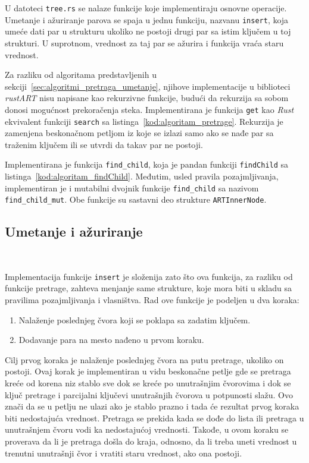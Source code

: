 \documentclass[12pt,oneside]{memoir}
\begin{document}
U datoteci \texttt{tree.rs} se nalaze funkcije koje implementiraju
osnovne operacije.
Umetanje i ažuriranje parova se spaja u jednu funkciju,
nazvanu \texttt{insert}, koja umeće dati par
u strukturu ukoliko ne postoji drugi par sa istim ključem u toj strukturi.
U suprotnom, vrednost za taj par se ažurira i funkcija vraća staru vrednost.

Za razliku od algoritama predstavljenih u
sekciji~\ref{sec:algoritmi_pretraga_umetanje}, njihove implementacije u
biblioteci \textit{rustART} nisu napisane kao rekurzivne funkcije,
budući da rekurzija sa sobom donosi mogućnost prekoračenja
steka. Implementirana je
funkcija \texttt{get} kao \textit{Rust} ekvivalent funkciji
\texttt{search} sa listinga~\ref{kod:algoritam_pretrage}.
Rekurzija je zamenjena beskonačnom petljom iz koje se izlazi samo
ako se nađe par sa traženim ključem ili se utvrdi da takav par
ne postoji.

Implementirana je funkcija \texttt{find\_child},
koja je pandan funkciji \texttt{findChild}
sa listinga~\ref{kod:algoritam_findChild}. Međutim, usled
pravila pozajmljivanja, implementiran je i mutabilni dvojnik
funkcije \texttt{find\_child}
sa nazivom \texttt{find\_child\_mut}. Obe funkcije su sastavni
deo strukture \texttt{ARTInnerNode}.

\subsection{Umetanje i ažuriranje}~\label{subsec:umetanje_azururanje}

Implementacija funkcije \texttt{insert} je složenija
zato što ova funkcija, za razliku od funkcije pretrage, zahteva
menjanje same strukture, koje mora biti u skladu sa pravilima
pozajmljivanja i vlasništva. Rad ove funkcije je podeljen u
dva koraka:

\begin{enumerate}
  \item Nalaženje poslednjeg
        čvora koji se poklapa sa zadatim ključem.

  \item Dodavanje para na mesto nađeno u prvom koraku.
\end{enumerate}

Cilj prvog koraka je nalaženje poslednjeg čvora
na putu pretrage, ukoliko on postoji.
Ovaj korak je implementiran u vidu beskonačne petlje
gde se pretraga kreće od korena
niz stablo sve dok se kreće po unutrašnjim čvorovima i dok se ključ
pretrage i parcijalni ključevi unutrašnjih čvorova u potpunosti slažu.
Ovo znači da se u petlju ne ulazi ako je stablo prazno i tada će
rezultat prvog koraka biti nedostajuća vrednost.
Pretraga se prekida kada se dođe do lista ili pretraga u unutrašnjem
čvoru vodi ka nedostajućoj vrednosti.
Takođe, u ovom koraku se proverava da li je pretraga došla do kraja,
odnosno, da li treba uneti vrednost u trenutni unutrašnji čvor
i vratiti staru vrednost, ako ona postoji.
\end{document}
